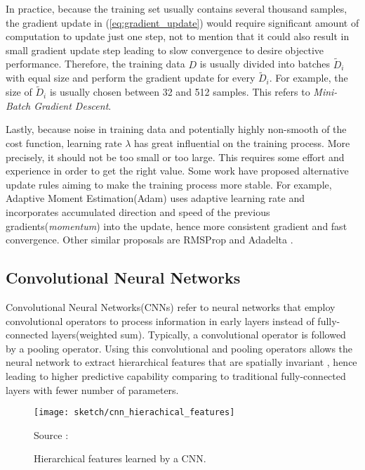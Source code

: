 In practice, because the training set usually contains several thousand samples, the gradient update in  (\ref{eq:gradient_update}) would require significant amount of computation to update just one step, not to mention that it could also result in small gradient update step leading to slow convergence to desire objective performance. Therefore, the training data $D$ is usually divided into batches  $\widetilde{D}_i$  with equal size and perform the gradient update for every $\widetilde{D}_i$. For example, the size of $\widetilde{D}_i$ is usually chosen between 32 and 512 samples. This refers to \textit{Mini-Batch Gradient Descent}.

Lastly, because noise in training data and potentially highly non-smooth of the cost function, learning rate $\lambda$ has great influential on the training process. More precisely, it should not be too small or too large. This requires some effort and experience in order to get the right value. Some work have proposed alternative update rules aiming to make the training process more stable. For example,  Adaptive Moment Estimation(Adam)\cite{KingmaAdamMethodStochastic2014}  uses adaptive learning rate  and incorporates accumulated direction and speed of the previous gradients(\textit{momentum}) into the update, hence more consistent gradient and fast convergence. Other similar proposals are RMSProp \cite{TielemanLectureRmsPropDivide2012} and Adadelta \cite{ZeilerADADELTAAdaptiveLearning2012}.


\subsection{Convolutional Neural Networks} \label{sec:conv}
Convolutional Neural Networks(CNNs) refer to neural networks that employ convolutional operators to process information in early layers instead of fully-connected layers(weighted sum). Typically, a convolutional operator is followed by a pooling operator. Using this convolutional and pooling operators allows the neural network to extract hierarchical features that are spatially invariant \cite{ZeilerVisualizingUnderstandingConvolutional2013}, hence leading to higher predictive capability comparing to traditional fully-connected layers with fewer number of parameters.

\begin{figure}[!hbt]
    \begin{center}
		\texttt{[image: sketch/cnn\_hierachical\_features]}
		\caption{Hierarchical features learned by a CNN.}
		\label{fig:conv_intuition}
		\small{Source : \cite{LeeConvolutionalDeepBelief2009}}
	\end{center}
\end{figure}


